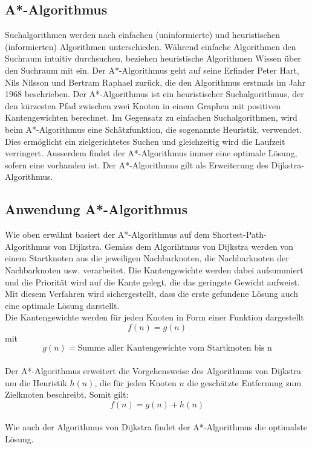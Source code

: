 \subsection{A*-Algorithmus}
Suchalgorithmen werden nach einfachen (uninformierte) und heuristischen (informierten) Algorithmen unterschieden. Während einfache Algorithmen den Suchraum intuitiv durchsuchen, beziehen heuristische Algorithmen Wissen über den Suchraum mit ein.
Der A*-Algorithmus geht auf seine Erfinder Peter Hart, Nils Nilsson und Bertram Raphael zurück, die den Algorithmus erstmals im Jahr 1968 beschrieben.
Der A*-Algorithmus ist ein heuristischer Suchalgorithmus, der den kürzesten Pfad zwischen zwei Knoten in einem Graphen mit positiven Kantengewichten berechnet.
Im Gegensatz zu einfachen Suchalgorithmen, wird beim A*-Algorithmus eine Schätzfunktion, die sogenannte Heuristik, verwendet. Dies ermöglicht ein zielgerichtetes Suchen und gleichzeitig wird die Laufzeit verringert.
Ausserdem findet der A*-Algorithmus immer eine optimale Lösung, sofern eine vorhanden ist.
Der A*-Algorithmus gilt als Erweiterung des Dijkstra-Algorithmus.

\subsection{Anwendung A*-Algorithmus}
Wie oben erwähnt basiert der A*-Algorithmus auf dem Shortest-Path-Algorithmus von Dijkstra. Gemäss dem Algorihtmus von Dijkstra werden von einem Startknoten aus die jeweiligen Nachbarknoten, die Nachbarknoten der Nachbarknoten usw. verarbeitet. Die Kantengewichte werden dabei aufsummiert und die Priorität wird auf die Kante gelegt, die das geringste Gewicht aufweist. Mit diesem Verfahren wird sichergestellt, dass die erste gefundene Lösung auch eine optimale Lösung darstellt.\\

Die Kantengewichte werden für jeden Knoten in Form einer Funktion dargestellt
\begin{equation}f(n)=g(n)\end{equation} mit
\begin{equation}g(n)=\text{Summe aller Kantengewichte vom Startknoten bis n}\end{equation}\\
Der A*-Algorithmus erweitert die Vorgehensweise des Algorithmus von Dijkstra um die Heuristik $h(n)$, die für jeden Knoten $n$ die geschätzte Entfernung zum Zielknoten beschreibt.
Somit gilt:
\begin{equation}f(n)=g(n)+h(n)\end{equation}\\
Wie auch der Algorithmus von Dijkstra findet der A*-Algorithmus die optimalste Lösung.

